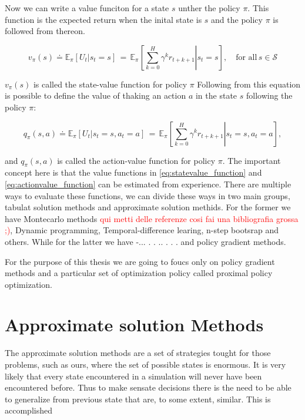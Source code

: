 Now we can write a value funciton for a state \( s \) unther the policy \( \pi \). This function is the expected return when the inital state is \( s \) and the policy \( \pi \) is followed from thereon.

\begin{equation}
v_\pi(s) \doteq \mathbb{E} _\pi \left[ U_t | s_t = s \right] \, =\,  \mathbb{E} _\pi \left[\left.\sum_{k = 0}^{H}\gamma^k r_{t+k+1}  \right| s_t = s \right], \quad \text{for all}\, s \in \mathcal{S} 
\label{eq:statevalue_function}
\end{equation}

\(  v_\pi(s)\) is called the state-value function for policy \( \pi \)
Following from this equation is possible to define the value of thaking an action \( a \) in the state \( s \) following the policy \( \pi \):

\begin{equation}
    q_\pi(s,a) \doteq \mathbb{E} _\pi \left[ U_t | s_t = s, a_t = a \right] \, =\,  \mathbb{E} _\pi \left[\left.\sum_{k = 0}^{H}\gamma^k r_{t+k+1}  \right| s_t = s, a_t = a \right],
    \label{eq:actionvalue_function}
\end{equation}
    
and \( q_\pi(s,a) \) is called the action-value function for policy \( \pi \). The important concept here is that the value functions in \ref{eq:statevalue_function} and \ref{eq:actionvalue_function} can be estimated from experience. There are multiple ways to evaluate these functions, we can divide these ways in two main groups, tabulat solution methods and approximate solution methids. For the former we have Montecarlo methods \textcolor{red}{qui metti delle referenze cosi fai una bibliografia grossa ;)}, Dynamic programming, Temporal-difference learing, n-step bootsrap and others. While for the latter we have -... . . .. . . . and policy gradient methods. 

For the purpose of this thesis we are going to foucs only on policy gradient methods and a particular set of optimization policy called proximal policy optimization.

\section{Approximate solution Methods}

The approximate solution methods are a set of strategies tought for those problems, such as ours, where the set of possible states is enormous. It is very likely that every state encountered in a simulation will never have been encountered before. Thus to make sensate decisions there is the need to be able to generalize from previous state that are, to some extent, similar. This is accomplished  



